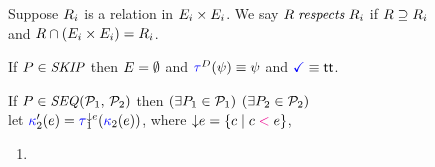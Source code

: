\begin{figure}
  \raggedright
  
  \noindent
  Suppose $R_i$ is a relation in $E_i\times E_i$.
  We say $\aRel \rextendsdef{\aRel_i}{}$ if
  ${R}\supseteq {R_i}$ and
  $R\cap(E_i\times E_i) = R_i$.
  \medskip

  \noindent
  If $P\in\textnormal{\textit{SKIP}}$ then $E = \emptyset$
  and $\aTr{\bEvs}{\bForm} \riff \bForm$
  and $\aTerm\riff\TRUE$.
  \medskip

  \noindent
  If $\aPS \in \sSEMI{\aPSS_1}{\aPSS_2}$ then $(\exists P_1\in\mathcal{P}_1)$ $(\exists P_2\in\mathcal{P}_2)$\\
  let
  $\labelingForm'_2(\aEv)=\aTr[1]{\Cdown{\aEv}}{\labelingForm_2(\aEv})$, where
  $\smash{\downarrow}e=\{ c \mid c \mathrel{{\color{magenta}<}} e \}$,
  \begin{multicols}{2}
    \begin{enumerate}[topsep=0pt,label=(\textsc{s}\arabic*),ref=\textsc{s}\arabic*]
    \item \label{seq-E}

\end{enumerate}
\end{multicols}
\end{figure}
